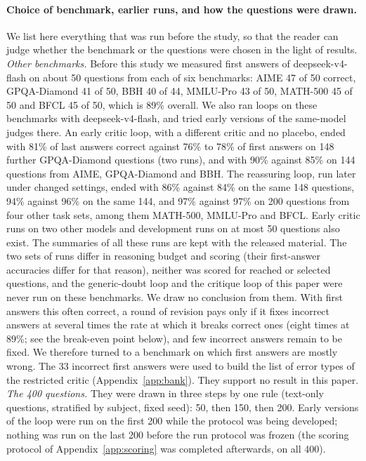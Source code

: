 \documentclass[11pt]{article}
\begin{document}
\paragraph{Choice of benchmark, earlier runs, and how the questions were drawn.}
We list here everything that was run before the study, so that the reader can judge whether the benchmark or the questions were chosen in the light of results.
\emph{Other benchmarks.}
Before this study we measured first answers of deepseek-v4-flash on about 50 questions from each of six benchmarks: AIME 47 of 50 correct, GPQA-Diamond 41 of 50, BBH 40 of 44, MMLU-Pro 43 of 50, MATH-500 45 of 50 and BFCL 45 of 50, which is 89\% overall.
We also ran loops on these benchmarks with deepseek-v4-flash, and tried early versions of the same-model judges there.
An early critic loop, with a different critic and no placebo, ended with 81\% of last answers correct against 76\% to 78\% of first answers on 148 further GPQA-Diamond questions (two runs), and with 90\% against 85\% on 144 questions from AIME, GPQA-Diamond and BBH.
The reassuring loop, run later under changed settings, ended with 86\% against 84\% on the same 148 questions, 94\% against 96\% on the same 144, and 97\% against 97\% on 200 questions from four other task sets, among them MATH-500, MMLU-Pro and BFCL.
Early critic runs on two other models and development runs on at most 50 questions also exist. The summaries of all these runs are kept with the released material.
The two sets of runs differ in reasoning budget and scoring (their first-answer accuracies differ for that reason), neither was scored for reached or selected questions, and the generic-doubt loop and the critique loop of this paper were never run on these benchmarks.
We draw no conclusion from them.
With first answers this often correct, a round of revision pays only if it fixes incorrect answers at several times the rate at which it breaks correct ones (eight times at 89\%; see the break-even point below), and few incorrect answers remain to be fixed.
We therefore turned to a benchmark on which first answers are mostly wrong.
The 33 incorrect first answers were used to build the list of error types of the restricted critic (Appendix~\ref{app:bank}). They support no result in this paper.
\emph{The 400 questions.}
They were drawn in three steps by one rule (text-only questions, stratified by subject, fixed seed): 50, then 150, then 200.
Early versions of the loop were run on the first 200 while the protocol was being developed; nothing was run on the last 200 before the run protocol was frozen (the scoring protocol of Appendix~\ref{app:scoring} was completed afterwards, on all 400).
\end{document}
